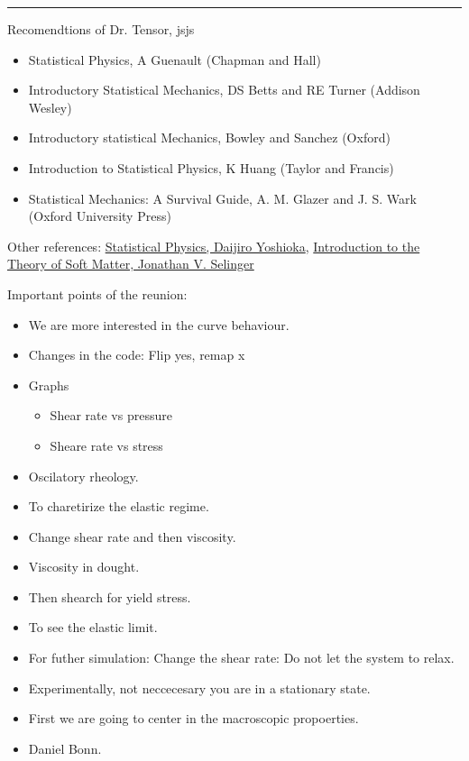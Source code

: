 \documentclass[a4paper, 11pt, oneside]{researchjournal} %
\begin{document}
\rule{\textwidth}{0.4pt}

Recomendtions of Dr. Tensor, jsjs

\begin{itemize}
	\item Statistical Physics, A Guenault (Chapman and Hall)
	\item Introductory Statistical Mechanics, DS Betts and RE Turner (Addison Wesley)
	\item Introductory statistical Mechanics, Bowley and Sanchez (Oxford)
	\item Introduction to Statistical Physics, K Huang (Taylor and Francis)
	\item Statistical Mechanics: A Survival Guide, A. M. Glazer and J. S. Wark (Oxford University Press)
\end{itemize}

Other references: 
\href{https://link.springer.com/book/10.1007/978-3-540-28606-6}{Statistical Physics, Daijiro Yoshioka}, 
\href{https://link.springer.com/book/10.1007/978-3-319-21054-4}{Introduction to the Theory of Soft Matter, Jonathan V. Selinger}


Important points of the reunion:
\begin{itemize}
	\item We are more interested in the curve behaviour.
	\item Changes in the code: Flip yes, remap x
	\item Graphs
	\begin{itemize}
		\item Shear rate vs pressure
		\item Sheare rate vs stress
	\end{itemize}
	\item Oscilatory rheology.
	\item To charetirize the elastic regime.
	\item Change shear rate and then viscosity.
	\item Viscosity in dought.
	\item Then shearch for yield stress.
	\item To see the elastic limit.
	\item For futher simulation: Change the shear rate: Do not let the system to relax.
	\item Experimentally, not neccecesary you are in a stationary state.
	\item First we are going to center in the macroscopic propoerties.
	\item Daniel Bonn.
\end{itemize}
\end{document}
